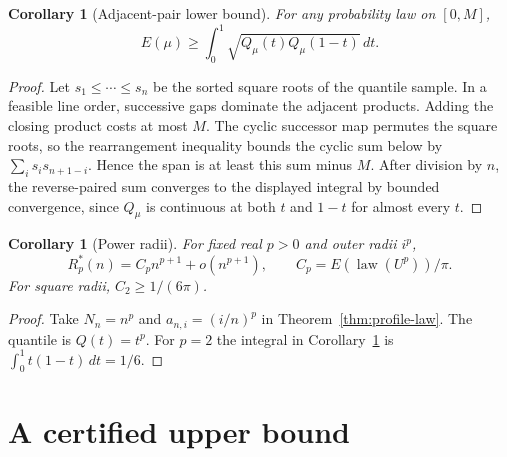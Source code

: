 \documentclass[11pt,letterpaper]{article}
\newtheorem{corollary}[theorem]{Corollary}
\theoremstyle{definition}\newtheorem{definition}[theorem]{Definition}
\theoremstyle{remark}\newtheorem{remark}[theorem]{Remark}
\begin{document}
\begin{corollary}[Adjacent-pair lower bound]\label{cor:profile-adjacent}
For any probability law on $[0,M]$,
\[
 E(\mu)\ge\int_0^1\sqrt{Q_\mu(t)Q_\mu(1-t)}\,dt .
\]
\end{corollary}
\begin{proof}
Let $s_1\le\cdots\le s_n$ be the sorted square roots of the quantile
sample. In a feasible line order, successive gaps dominate the adjacent
products. Adding the closing product costs at most $M$. The cyclic
successor map permutes the square roots, so the rearrangement inequality
bounds the cyclic sum below by $\sum_i s_i s_{n+1-i}$. Hence the span
is at least this sum minus $M$. After division by $n$, the reverse-paired
sum converges to the displayed integral by bounded convergence, since
$Q_\mu$ is continuous at both $t$ and $1-t$ for almost every $t$.
\end{proof}

\begin{corollary}[Power radii]\label{cor:profile-powers}
For fixed real $p>0$ and outer radii $i^p$,
\[
 R_p^*(n)=C_p n^{p+1}+o(n^{p+1}),\qquad
 C_p=E(\operatorname{law}(U^p))/\pi .
\]
For square radii, $C_2\ge 1/(6\pi)$.
\end{corollary}
\begin{proof}
Take $N_n=n^p$ and $a_{n,i}=(i/n)^p$ in Theorem~\ref{thm:profile-law}.
The quantile is $Q(t)=t^p$. For $p=2$ the integral in
Corollary~\ref{cor:profile-adjacent} is $\int_0^1 t(1-t)\,dt=1/6$.
\end{proof}

\section{A certified upper bound}\label{sec:upper}
\end{document}
